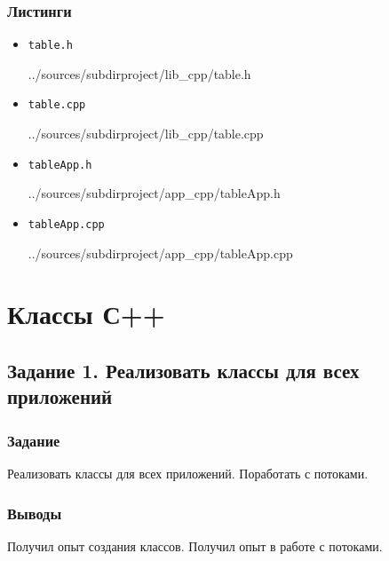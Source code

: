 \documentclass[12pt,a4paper]{report}
\begin{document}
\subsection*{Листинги}
\begin{itemize}
\item[] \verb-table.h-

{../sources/subdirproject/lib_cpp/table.h}

\item[] \verb-table.cpp-

{../sources/subdirproject/lib_cpp/table.cpp}

\item[] \verb-tableApp.h-

{../sources/subdirproject/app_cpp/tableApp.h}

\item[] \verb-tableApp.cpp-

{../sources/subdirproject/app_cpp/tableApp.cpp}
\end{itemize}

%

\chapter{Классы С++}
\section{Задание 1. Реализовать классы для всех приложений}
\subsection{Задание}
\hspace{\parindent}
Реализовать классы для всех приложений. Поработать с потоками.
\subsection{Выводы}
\hspace{\parindent}
Получил опыт создания классов. Получил опыт в работе с потоками.
\end{document}
